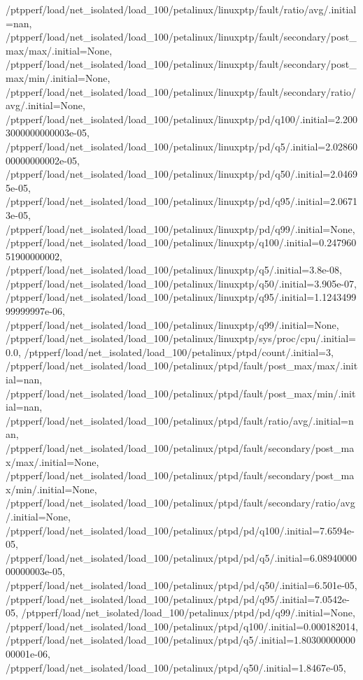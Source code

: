 {    /ptpperf/load/net_isolated/load_100/petalinux/linuxptp/fault/ratio/avg/.initial=nan,
    /ptpperf/load/net_isolated/load_100/petalinux/linuxptp/fault/secondary/post_max/max/.initial=None,
    /ptpperf/load/net_isolated/load_100/petalinux/linuxptp/fault/secondary/post_max/min/.initial=None,
    /ptpperf/load/net_isolated/load_100/petalinux/linuxptp/fault/secondary/ratio/avg/.initial=None,
    /ptpperf/load/net_isolated/load_100/petalinux/linuxptp/pd/q100/.initial=2.2003000000000003e-05,
    /ptpperf/load/net_isolated/load_100/petalinux/linuxptp/pd/q5/.initial=2.0286000000000002e-05,
    /ptpperf/load/net_isolated/load_100/petalinux/linuxptp/pd/q50/.initial=2.04695e-05,
    /ptpperf/load/net_isolated/load_100/petalinux/linuxptp/pd/q95/.initial=2.06713e-05,
    /ptpperf/load/net_isolated/load_100/petalinux/linuxptp/pd/q99/.initial=None,
    /ptpperf/load/net_isolated/load_100/petalinux/linuxptp/q100/.initial=0.24796051900000002,
    /ptpperf/load/net_isolated/load_100/petalinux/linuxptp/q5/.initial=3.8e-08,
    /ptpperf/load/net_isolated/load_100/petalinux/linuxptp/q50/.initial=3.905e-07,
    /ptpperf/load/net_isolated/load_100/petalinux/linuxptp/q95/.initial=1.124349999999997e-06,
    /ptpperf/load/net_isolated/load_100/petalinux/linuxptp/q99/.initial=None,
    /ptpperf/load/net_isolated/load_100/petalinux/linuxptp/sys/proc/cpu/.initial=0.0,
    /ptpperf/load/net_isolated/load_100/petalinux/ptpd/count/.initial=3,
    /ptpperf/load/net_isolated/load_100/petalinux/ptpd/fault/post_max/max/.initial=nan,
    /ptpperf/load/net_isolated/load_100/petalinux/ptpd/fault/post_max/min/.initial=nan,
    /ptpperf/load/net_isolated/load_100/petalinux/ptpd/fault/ratio/avg/.initial=nan,
    /ptpperf/load/net_isolated/load_100/petalinux/ptpd/fault/secondary/post_max/max/.initial=None,
    /ptpperf/load/net_isolated/load_100/petalinux/ptpd/fault/secondary/post_max/min/.initial=None,
    /ptpperf/load/net_isolated/load_100/petalinux/ptpd/fault/secondary/ratio/avg/.initial=None,
    /ptpperf/load/net_isolated/load_100/petalinux/ptpd/pd/q100/.initial=7.6594e-05,
    /ptpperf/load/net_isolated/load_100/petalinux/ptpd/pd/q5/.initial=6.0894000000000003e-05,
    /ptpperf/load/net_isolated/load_100/petalinux/ptpd/pd/q50/.initial=6.501e-05,
    /ptpperf/load/net_isolated/load_100/petalinux/ptpd/pd/q95/.initial=7.0542e-05,
    /ptpperf/load/net_isolated/load_100/petalinux/ptpd/pd/q99/.initial=None,
    /ptpperf/load/net_isolated/load_100/petalinux/ptpd/q100/.initial=0.000182014,
    /ptpperf/load/net_isolated/load_100/petalinux/ptpd/q5/.initial=1.8030000000000001e-06,
    /ptpperf/load/net_isolated/load_100/petalinux/ptpd/q50/.initial=1.8467e-05,
}
